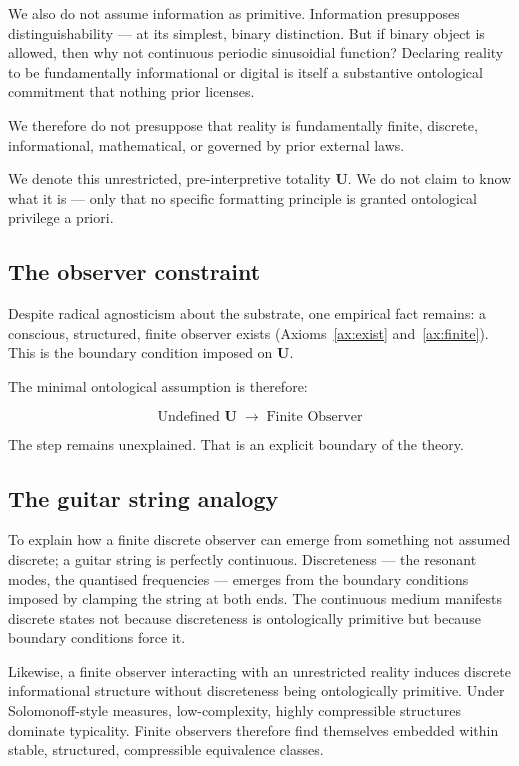 \documentclass[12pt,a4paper]{article}
\begin{document}
We also do not assume information as primitive. Information presupposes
distinguishability --- at its simplest, binary distinction. But if binary
object is allowed, then why not continuous periodic sinusoidial function?
Declaring reality to be fundamentally informational or digital is itself a substantive
ontological commitment that nothing prior licenses.

We therefore do not presuppose that reality is fundamentally finite, discrete,
informational, mathematical, or governed by prior external laws.

We denote this unrestricted, pre-interpretive totality $\mathbf{U}$. We do
not claim to know what it is --- only that no specific formatting principle is
granted ontological privilege a priori.

\subsection*{The observer constraint}

Despite radical agnosticism about the substrate, one empirical fact remains:
a conscious, structured, finite observer exists (Axioms~\ref{ax:exist}
and~\ref{ax:finite}). This is the boundary condition imposed on $\mathbf{U}$.

The minimal ontological assumption is therefore:

\begin{equation}
\text{Undefined } \mathbf{U} \;\longrightarrow\; \text{Finite Observer}
\end{equation}

The step remains unexplained. That is an explicit boundary of the theory.

\subsection*{The guitar string analogy}

To explain how a finite discrete observer can emerge from something not assumed
discrete; a guitar string is perfectly continuous. Discreteness --- the resonant modes,
the quantised frequencies --- emerges from the boundary conditions imposed by
clamping the string at both ends. The continuous medium manifests discrete
states not because discreteness is ontologically primitive but because boundary
conditions force it.

Likewise, a finite observer interacting with an unrestricted reality induces
discrete informational structure without discreteness being ontologically
primitive. Under Solomonoff-style measures, low-complexity, highly compressible
structures dominate typicality. Finite observers therefore find themselves
embedded within stable, structured, compressible equivalence classes.
\end{document}
